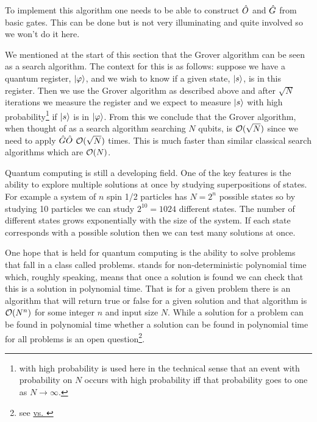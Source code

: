     To implement this algorithm one needs to be able to construct \(\hat{O}\) and \(\hat{G}\) from basic gates.
    This can be done but is not very illuminating and quite involved so we won't do it here.
    
    We mentioned at the start of this section that the Grover algorithm can be seen as a search algorithm.
    The context for this is as follows: suppose we have a quantum register, \(\vert {\varphi} \rangle\), and we wish to know if a given state, \(\vert {s} \rangle\), is in this register.
    Then we use the Grover algorithm as described above and after \(\sqrt{N}\) iterations we measure the register and we expect to measure \(\vert {s} \rangle\) with high probability\footnote{with high probability is used here in the technical sense that an event with probability on \(N\) occurs with high probability iff that probability goes to one as \(N\to\infty\).} if \(\vert {s} \rangle\) is in \(\vert {\varphi} \rangle\).
    From this we conclude that the Grover algorithm, when thought of as a search algorithm searching \(N\) qubits, is \(\mathcal{O}(\sqrt{N})\) since we need to apply \(\hat{G}\hat{O}\) \(\mathcal{O}(\sqrt{N})\) times.
    This is much faster than similar classical search algorithms which are \(\mathcal{O}(N)\).
    
    Quantum computing is still a developing field.
    One of the key features is the ability to explore multiple solutions at once by studying superpositions of states.
    For example a system of \(n\) spin 1/2 particles has \(N = 2^n\) possible states so by studying 10 particles we can study \(2^{10} = 1024\) different states.
    The number of different states grows exponentially with the size of the system.
    If each state corresponds with a possible solution then we can test many solutions at once.
    
    One hope that is held for quantum computing is the ability to solve problems that fall in a class called \NPcomplexity problems.
    \NPcomplexity stands for non-deterministic polynomial time which, roughly speaking, means that once a solution is found we can check that this is a solution in polynomial time.
    That is for a given \NPcomplexity problem there is an algorithm that will return true or false for a given solution and that algorithm is \(\mathcal{O}(N^n)\) for some integer \(n\) and input size \(N\).
    While a solution for a \NPcomplexity problem can be found in polynomial time whether a solution can be found in polynomial time for all \NPcomplexity problems is an open question\footnote{see  \href{https://en.wikipedia.org/wiki/P_versus_NP_problem}{\Pcomplexity vs. \NPcomplexity}}.
    

